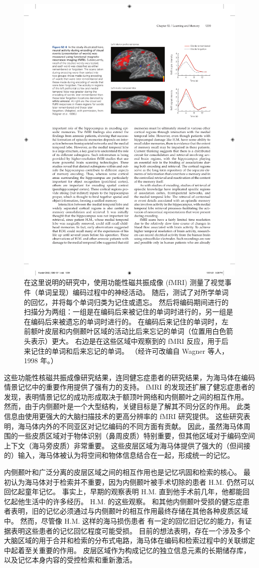 \begin{figure}[htbp]
	\centering
	\includegraphics[width=0.7\linewidth]{chap52/fig_52_6}
	\caption{在这里说明的研究中，使用功能性磁共振成像 (fMRI) 测量了视觉事件（单词呈现）编码过程中的神经活动。 随后，测试了对所学单词的回忆，并将每个单词归类为记住或遗忘。 然后将编码期间进行的扫描分为两组：一组是在编码后来被记住的单词时进行的，另一组是在编码后来被遗忘的单词时进行的。 在编码后来记住的单词时，左前额叶皮层和内侧颞叶区域的活动比后来忘记的单词（位置用白色箭头表示）更大。 右边是在这些区域中观察到的 fMRI 反应，用于后来记住的单词和后来忘记的单词。 （经许可改编自 Wagner 等人，1998 年。）}
	\label{fig:52_6}
\end{figure}


这些功能性核磁共振成像研究结果，连同健忘症患者的研究结果，为海马体在编码情景记忆中的重要作用提供了强有力的支持。
fMRI 的发现还扩展了健忘症患者的发现，表明情景记忆的成功形成取决于额顶叶网络和内侧颞叶之间的相互作用。
然而，由于内侧颞叶是一个大型结构，关键目标是了解其不同分区的作用。
此类信息由使用更强大的大脑扫描技术的更高分辨率的 fMRI 研究提供。
这些研究表明，海马体内外的不同亚区对记忆编码的不同方面有贡献。
因此，虽然海马体周围的一些皮质区域对于物体识别（鼻周皮质）特别重要，但其他区域对于编码空间上下文（海马旁皮质）非常重要。
这些皮层区域为海马体提供了强大的（但间接的）输入，海马体被认为将空间和物体信息结合在一起，形成统一的记忆。


内侧颞叶和广泛分离的皮层区域之间的相互作用也是记忆巩固和检索的核心。
最初认为海马体对于检索并不重要，因为内侧颞叶被手术切除的患者 H.M. 仍然可以回忆起童年记忆。 事实上，早期的观察表明 H.M. 直到他手术前几年，他都能回忆起他生活中的许多经历。
H.M. 的这些观察。 和其他内侧颞叶受损的健忘症患者表明，旧的记忆必须通过与内侧颞叶的相互作用最终存储在其他各种皮质区域中。
然而，尽管像 H.M. 这样的海马损伤患者 有一定的回忆旧记忆的能力，有证据表明这些患者的记忆回忆程度可能受损。
目前的想法表明，存在一个涉及多个大脑区域的用于合并和检索的分布式电路，海马体在编码和检索过程中的关联绑定中起着至关重要的作用。
皮层区域作为构成记忆的独立信息元素的长期储存库，以及记忆本身内容的受控检索和重新激活。


